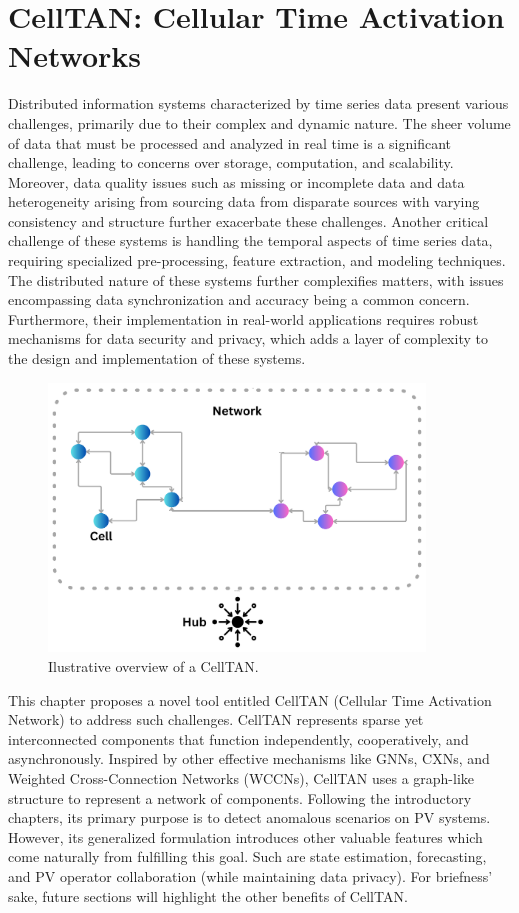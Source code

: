 \chapter{CellTAN: Cellular Time Activation Networks} \label{chap:chap4}

Distributed information systems characterized by time series data present various challenges, primarily due to their complex and dynamic nature. The sheer volume of data that must be processed and analyzed in real time is a significant challenge, leading to concerns over storage, computation, and scalability. Moreover, data quality issues such as missing or incomplete data and data heterogeneity arising from sourcing data from disparate sources with varying consistency and structure further exacerbate these challenges. Another critical challenge of these systems is handling the temporal aspects of time series data, requiring specialized pre-processing, feature extraction, and modeling techniques. The distributed nature of these systems further complexifies matters, with issues encompassing data synchronization and accuracy being a common concern. Furthermore, their implementation in real-world applications requires robust mechanisms for data security and privacy, which adds a layer of complexity to the design and implementation of these systems.

\begin{figure}[h]
    \centering
    \includegraphics[width=10cm]{figures/chapter4/cell/celltan.pdf}
    \caption{Ilustrative overview of a CellTAN.}
    \label{fig:celltan}
\end{figure}

This chapter proposes a novel tool entitled CellTAN (Cellular Time Activation Network) to address such challenges. CellTAN represents sparse yet interconnected components that function independently, cooperatively, and asynchronously.
Inspired by other effective mechanisms like GNNs, CXNs, and Weighted Cross-Connection Networks (WCCNs), CellTAN uses a graph-like structure to represent a network of components. Following the introductory chapters, its primary purpose is to detect anomalous scenarios on PV systems. However, its generalized formulation introduces other valuable features which come naturally from fulfilling this goal. Such are state estimation, forecasting, and PV operator collaboration (while maintaining data privacy). For briefness' sake, future sections will highlight the other benefits of CellTAN.

